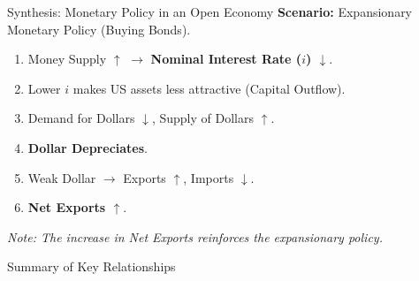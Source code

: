 \documentclass[aspectratio=169]{beamer}
\begin{document}
\begin{frame}{Synthesis: Monetary Policy in an Open Economy}
    \textbf{Scenario:} Expansionary Monetary Policy (Buying Bonds).
    \vspace{0.3cm}
    \begin{enumerate}
        \item Money Supply $\uparrow$ $\rightarrow$ \textbf{Nominal Interest Rate ($i$) $\downarrow$}.
        \item Lower $i$ makes US assets less attractive (Capital Outflow).
        \item Demand for Dollars $\downarrow$, Supply of Dollars $\uparrow$.
        \item \textbf{Dollar Depreciates}.
        \item Weak Dollar $\rightarrow$ Exports $\uparrow$, Imports $\downarrow$.
        \item \textbf{Net Exports $\uparrow$}.
    \end{enumerate}
    \vspace{0.3cm}
    \textit{Note: The increase in Net Exports reinforces the expansionary policy.}
\end{frame}

\begin{frame}{Summary of Key Relationships}
    \begin{center}
    \end{center}
\end{frame}
\end{document}
